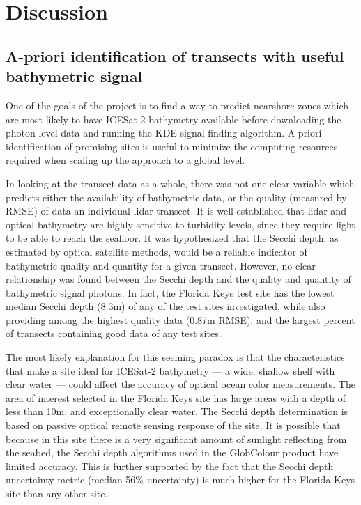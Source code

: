 \chapter{Discussion}

\section{A-priori identification of transects with useful bathymetric signal}
One of the goals of the project is to find a way to predict nearshore zones which are most likely to have ICESat-2 bathymetry available before downloading the photon-level data and running the KDE signal finding algorithm. A-priori identification of promising sites is useful to minimize the computing resources required when scaling up the approach to a global level.

In looking at the transect data as a whole, there was not one clear variable which predicts either the availability of bathymetric data, or the quality  (measured by RMSE) of data an individual lidar transect. It is well-established that lidar and optical bathymetry are highly sensitive to turbidity levels, since they require light to be able to reach the seafloor. It was hypothesized that the Secchi depth, as estimated by optical satellite methods, would be a reliable indicator of bathymetric quality and quantity for a given transect. However, no clear relationship was found between the Secchi depth and the quality and quantity of bathymetric signal photons. In fact, the Florida Keys test site has the lowest median Secchi depth (8.3m) of any of the test sites investigated, while also providing among the highest quality data (0.87m RMSE), and the largest percent of transects containing good data of any test sites. 

The most likely explanation for this seeming paradox is that the characteristics that make a site ideal for ICESat-2 bathymetry --- a wide, shallow shelf with clear water --- could affect the accuracy of optical ocean color measurements. The area of interest selected in the Florida Keys site has large areas with a depth of less than 10m, and exceptionally clear water. The Secchi depth determination is based on passive optical remote sensing response of the site. It is possible that because in this site there is a very significant amount of sunlight reflecting from the seabed, the Secchi depth algorithms used in the GlobColour product have limited accuracy. This is further supported by the fact that the Secchi depth uncertainty metric (median 56\% uncertainty) is much higher for the Florida Keys site than any other site. 

